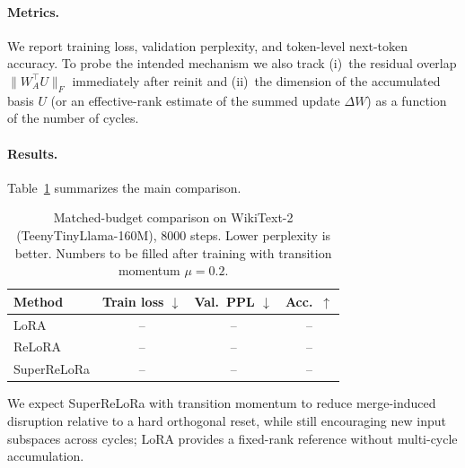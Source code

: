 \paragraph{Metrics.}
We report training loss, validation perplexity, and token-level next-token accuracy.
To probe the intended mechanism we also track (i)~the residual overlap $\|W_A^\top U\|_F$ immediately after reinit and (ii)~the dimension of the accumulated basis $U$ (or an effective-rank estimate of the summed update $\Delta W$) as a function of the number of cycles.

\paragraph{Results.}
Table~\ref{tab:main} summarizes the main comparison.
\begin{table}[t]
\centering
\caption{Matched-budget comparison on WikiText-2 (TeenyTinyLlama-160M), $8000$ steps.
Lower perplexity is better.
Numbers to be filled after training with transition momentum $\mu{=}0.2$.}
\label{tab:main}
\begin{tabular}{lccc}
\toprule
Method & Train loss $\downarrow$ & Val.\ PPL $\downarrow$ & Acc.\ $\uparrow$ \\
\midrule
LoRA & -- & -- & -- \\
ReLoRA & -- & -- & -- \\
SuperReLoRa & -- & -- & -- \\
\bottomrule
\end{tabular}
\end{table}

We expect SuperReLoRa with transition momentum to reduce merge-induced disruption relative to a hard orthogonal reset, while still encouraging new input subspaces across cycles; LoRA provides a fixed-rank reference without multi-cycle accumulation.
